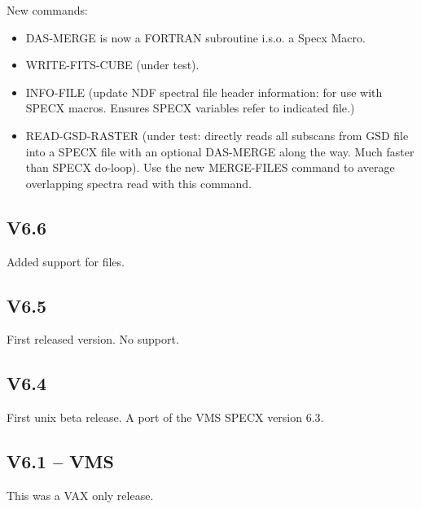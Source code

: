 \documentclass[twoside,11pt,nolof]{starlink}
\begin{document}
New commands:
\begin{itemize}
\item DAS-MERGE is now a FORTRAN subroutine i.s.o. a Specx Macro.

\item WRITE-FITS-CUBE (under test).

\item INFO-FILE  (update NDF spectral file header information: for
         use with SPECX macros. Ensures SPECX variables refer to
         indicated file.)

\item READ-GSD-RASTER (under test: directly reads all subscans
         from GSD file into a SPECX file with an optional DAS-MERGE
         along the way. Much faster than SPECX do-loop). Use the
         new MERGE-FILES command to average overlapping spectra
         read with this command.

\end{itemize}

\subsection{V6.6}

Added support for  files.

\subsection{V6.5}

First released version. No  support.

\subsection{V6.4}

First unix beta release. A port of the VMS SPECX version 6.3.

\subsection{V6.1 -- VMS}

This was a VAX only release.
\end{document}
